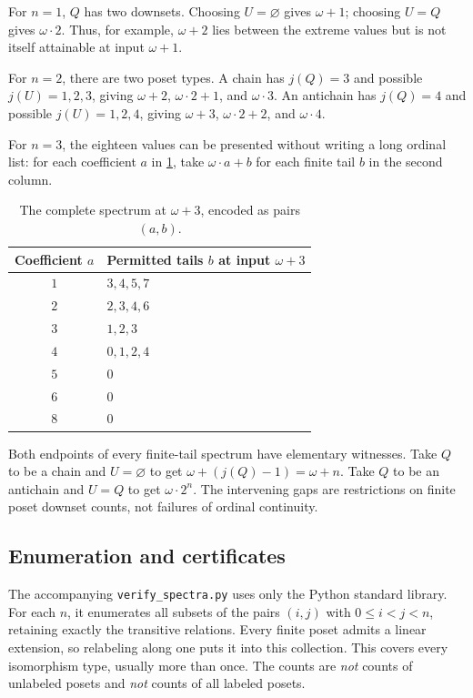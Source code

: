 \documentclass[11pt,a4paper]{article}
\theoremstyle{definition}
\numberwithin{equation}{section}
\begin{document}
For $n=1$, $Q$ has two downsets.  Choosing $U=\varnothing$ gives
$\omega+1$; choosing $U=Q$ gives $\omega\cdot2$.  Thus, for example,
$\omega+2$ lies between the extreme values but is not itself attainable
at input $\omega+1$.

For $n=2$, there are two poset types.  A chain has $j(Q)=3$ and possible
$j(U)=1,2,3$, giving $\omega+2$, $\omega\cdot2+1$, and $\omega\cdot3$.
An antichain has $j(Q)=4$ and possible $j(U)=1,2,4$, giving
$\omega+3$, $\omega\cdot2+2$, and $\omega\cdot4$.

For $n=3$, the eighteen values can be presented without writing a long
ordinal list: for each coefficient $a$ in \cref{tab:n3}, take
$\omega\cdot a+b$ for each finite tail $b$ in the second column.

\begin{table}[htbp]
\centering
\begin{tabular}{@{}cl@{}}
\toprule
Coefficient $a$ & Permitted tails $b$ at input $\omega+3$\\
\midrule
$1$ & $3,4,5,7$\\
$2$ & $2,3,4,6$\\
$3$ & $1,2,3$\\
$4$ & $0,1,2,4$\\
$5$ & $0$\\
$6$ & $0$\\
$8$ & $0$\\
\bottomrule
\end{tabular}
\caption{The complete spectrum at $\omega+3$, encoded as pairs $(a,b)$.}
\label{tab:n3}
\end{table}

Both endpoints of every finite-tail spectrum have elementary witnesses.
Take $Q$ to be a chain and $U=\varnothing$ to get
$\omega+(j(Q)-1)=\omega+n$.  Take $Q$ to be an antichain and $U=Q$ to get
$\omega\cdot2^n$.  The intervening gaps are restrictions on finite
poset downset counts, not failures of ordinal continuity.

\subsection{Enumeration and certificates}

The accompanying \texttt{verify\_spectra.py} uses only the Python standard
library.  For each $n$, it enumerates all subsets of the pairs $(i,j)$
with $0\leq i<j<n$, retaining exactly the transitive relations.
Every finite poset admits a linear extension, so relabeling along one
puts it into this collection.  This covers every isomorphism type,
usually more than once.  The counts are \emph{not} counts of unlabeled
posets and \emph{not} counts of all labeled posets.
\end{document}
